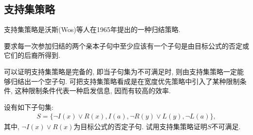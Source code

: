 \subsection{支持集策略}
 支持集策略是沃斯(Wos)等人在1965年提出的一种归结策略.
\begin{remark}
    要求每一次参加归结的两个亲本子句中至少应该有一个子句是由目标公式的否定或它们的后裔所得到.
\end{remark}
 可以证明支持集策略是完备的, 即当子句集为不可满足时, 则由支持集策略一定能够归结出一个空子句.
 可把支持集策略看成是在宽度优先策略中引入了某种限制条件, 这种限制条件代表一种启发信息, 因而有较高的效率.
\begin{example}
设有如下子句集:
\begin{align}
    S=\{\neg I(x)\vee R(x),  I(a),\neg  R(y)\vee L(y), \neg L(a)\},
\end{align}
其中, $\neg I(x)\vee R(x)$为目标公式的否定子句. 试用支持集策略证明$S$不可满足.
\end{example}
